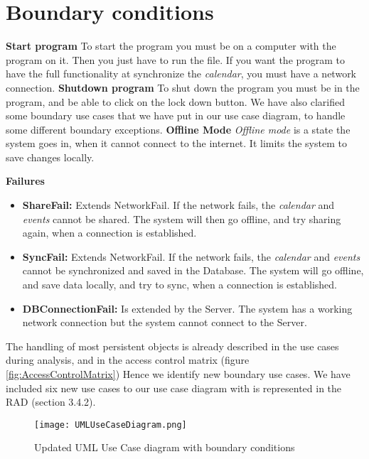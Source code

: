 \section{Boundary conditions}
\textbf{Start program}
To start the program you must be on a computer with the program on it. Then you just have to run the file. If you want the program to have the full functionality at synchronize the \textit{calendar}, you must have a network connection. 
\newline
\newline
\textbf{Shutdown program}
To shut down the program you must be in the program, and be able to click on the lock down button. 
We have also clarified some boundary use cases that we have put in our use case diagram, to handle some different boundary exceptions. 
\newline
\newline
\textbf{Offline Mode}
\textit{Offline mode} is a state the system goes in, when it cannot connect to the internet. It limits the system to save changes locally. 

\textbf{Failures}
\begin{itemize}
	\item \textbf{ShareFail:} Extends NetworkFail. If the network fails, the \textit{calendar} and \textit{events} cannot be shared. The system will then go offline, and try sharing again, when a connection is established. 
	\item \textbf{SyncFail:} Extends NetworkFail. If the network fails, the \textit{calendar} and \textit{events} cannot be synchronized and saved in the Database. The system will go offline, and save data locally, and try to sync, when a connection is established.
	\item \textbf{DBConnectionFail:} Is extended by the Server. The system has a working network connection but the system cannot connect to the Server. 
\end{itemize}
The handling of most persistent objects is already described in the use cases during analysis, and in the access control matrix (figure \ref{fig:AccessControlMatrix}) 
Hence we identify new boundary use cases. We have included six new use cases to our use case diagram with is represented in the RAD (section 3.4.2). 


\begin{figure}[h]
\centering
\texttt{[image: UMLUseCaseDiagram.png]}
\caption{Updated UML Use Case diagram with  boundary conditions \label{overflow}}
\label{figur:usecase}
\end{figure}
